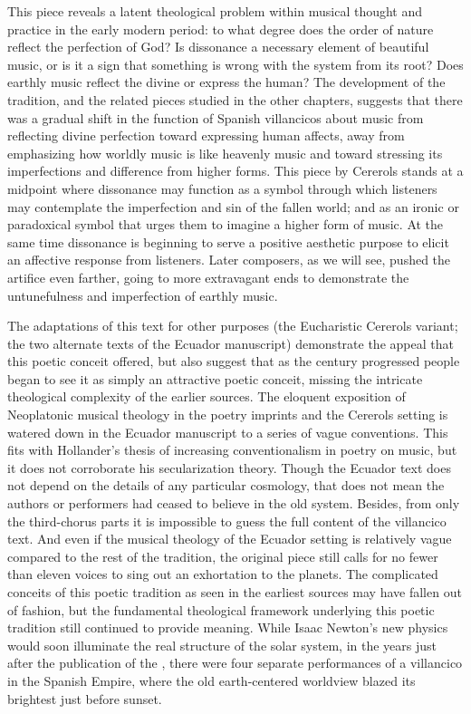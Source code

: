 This piece reveals a latent theological problem within musical thought and
practice in the early modern period: to what degree does the order of nature
reflect the perfection of God?
Is dissonance a necessary element of beautiful music, or is it a sign that
something is wrong with the system from its root?  
Does earthly music reflect the divine or express the human?
The development of the  tradition, and the related
pieces studied in the other chapters, suggests that there was a gradual shift in
the function of Spanish villancicos about music from reflecting divine
perfection toward expressing human affects, away from emphasizing how worldly
music is like heavenly music and toward stressing its imperfections and
difference from higher forms.
This piece by Cererols stands at a midpoint where dissonance may function as a
symbol through which listeners may contemplate the imperfection and sin of the
fallen world; and as an ironic or paradoxical symbol that urges them to imagine
a higher form of music. 
At the same time dissonance is beginning to serve a positive aesthetic purpose
to elicit an affective response from listeners.
Later composers, as we will see, pushed the artifice even farther, going to
more extravagant ends to demonstrate the untunefulness and imperfection of
earthly music.


The adaptations of this text for other purposes (the Eucharistic Cererols
variant; the two alternate texts of the Ecuador manuscript) demonstrate the
appeal that this poetic conceit offered, but also suggest that as the century
progressed people began to see it as simply an attractive poetic conceit,
missing the intricate theological complexity of the earlier sources.
The eloquent exposition of Neoplatonic musical theology in the poetry imprints
and the Cererols setting is watered down in the Ecuador manuscript to a series
of vague conventions.
This fits with Hollander's thesis of increasing conventionalism in poetry on
music, but it does not corroborate his secularization theory.
Though the Ecuador text does not depend on the details of any particular
cosmology, that does not mean the authors or performers had ceased to believe in
the old system.
Besides, from only the third-chorus parts it is impossible to guess the full
content of the villancico text.  And even if the musical theology of the Ecuador
setting is relatively vague compared to the rest of the tradition, the original
piece still calls for no fewer than eleven voices to sing out an exhortation to
the planets.
The complicated conceits of this poetic tradition as seen in the earliest
sources may have fallen out of fashion, but the fundamental theological
framework underlying this poetic tradition still continued to provide meaning.
While Isaac Newton's new physics would soon illuminate the real structure of
the solar system, in the years just after the publication of the
, there were four separate performances of a
 villancico in the Spanish Empire, where the old
earth-centered worldview blazed its brightest just before sunset.



\endinput

